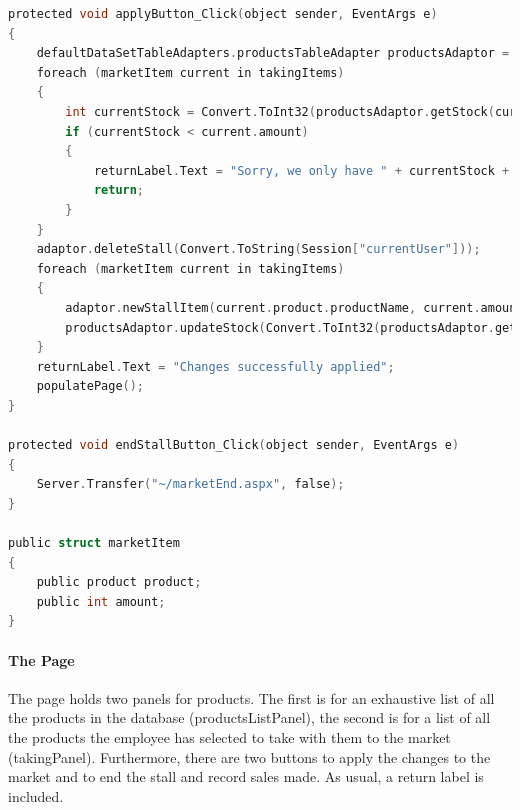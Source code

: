 ﻿\documentclass{article}
\begin{document}
\begin{lstlisting}[language=C]
protected void applyButton_Click(object sender, EventArgs e)
{
    defaultDataSetTableAdapters.productsTableAdapter productsAdaptor = new defaultDataSetTableAdapters.productsTableAdapter();
    foreach (marketItem current in takingItems)
    {
        int currentStock = Convert.ToInt32(productsAdaptor.getStock(current.product.productName));
        if (currentStock < current.amount)
        {
            returnLabel.Text = "Sorry, we only have " + currentStock + " of " + current.product.productName;
            return;
        }
    }
    adaptor.deleteStall(Convert.ToString(Session["currentUser"]));
    foreach (marketItem current in takingItems)
    {
        adaptor.newStallItem(current.product.productName, current.amount, Convert.ToString(Session["currentUser"]));
        productsAdaptor.updateStock(Convert.ToInt32(productsAdaptor.getStock(current.product.productName)) - current.amount, current.product.productName);
    }
    returnLabel.Text = "Changes successfully applied";
    populatePage();
}

protected void endStallButton_Click(object sender, EventArgs e)
{
    Server.Transfer("~/marketEnd.aspx", false);
}

public struct marketItem
{
    public product product;
    public int amount;
}
    \end{lstlisting}
    \paragraph{The Page}
    The page holds two panels for products.
    The first is for an exhaustive list of all the products in the database (productsListPanel), the second is for a list of all the products the employee has selected to take with them to the market (takingPanel).
    Furthermore, there are two buttons to apply the changes to the market and to end the stall and record sales made.
    As usual, a return label is included.
\end{document}
